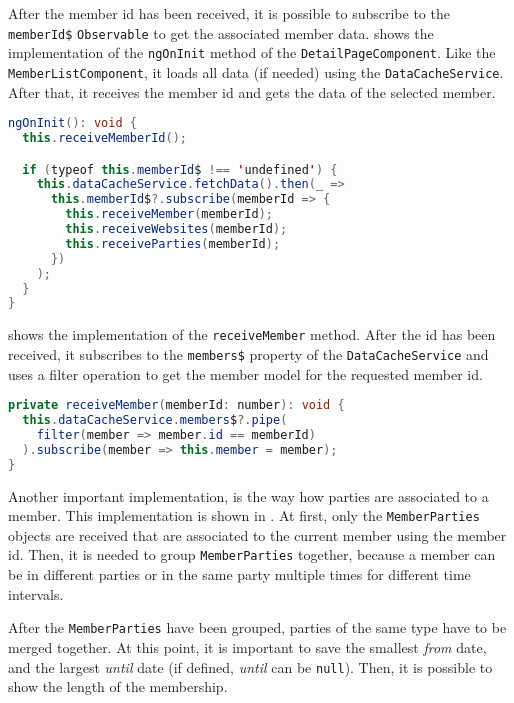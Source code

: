 After the member id has been received, it is possible to subscribe to the \texttt{memberId\$} \texttt{Observable} to get the associated member data.
 shows the implementation of the \texttt{ngOnInit} method of the \texttt{DetailPageComponent}. Like the \texttt{MemberListComponent}, it loads all data (if needed) using the \texttt{DataCacheService}. After that, it receives the member id and gets the data of the selected member.
\begin{lstlisting}[label=lst:02_impl_detail_ngoninit, caption=\texttt{ngOnInit} implementation of the \texttt{DetailPageComponent}, language=java]
ngOnInit(): void {
  this.receiveMemberId();

  if (typeof this.memberId$ !== 'undefined') {
    this.dataCacheService.fetchData().then(_ =>
      this.memberId$?.subscribe(memberId => {
        this.receiveMember(memberId);
        this.receiveWebsites(memberId);
        this.receiveParties(memberId);
      })
    );
  }
}
\end{lstlisting}


 shows the implementation of the \texttt{receiveMember} method. After the id has been received, it subscribes to the \texttt{members\$} property of the \texttt{DataCacheService} and uses a filter operation to get the member model for the requested member id.
\begin{lstlisting}[label=lst:02_impl_detail_receivemember, caption=Implementation of the \texttt{receiveMember} method, language=java]
private receiveMember(memberId: number): void {
  this.dataCacheService.members$?.pipe(
    filter(member => member.id == memberId)
  ).subscribe(member => this.member = member);
}
\end{lstlisting}


Another important implementation, is the way how parties are associated to a member. This implementation is shown in .
At first, only the \texttt{MemberParties} objects are received that are associated to the current member using the member id.
Then, it is needed to group \texttt{MemberParties} together, because a member can be in different parties or in the same party multiple times for different time intervals.

After the \texttt{MemberParties} have been grouped, parties of the same type have to be merged together. At this point, it is important to save the smallest \textit{from} date, and the largest \textit{until} date (if defined, \textit{until} can be \texttt{null}). Then, it is possible to show the length of the membership.

